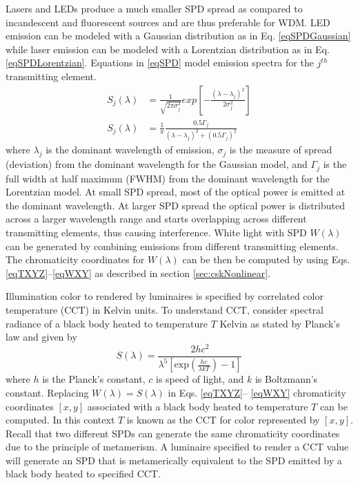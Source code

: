 Lasers and LEDs produce a much smaller SPD spread as compared to incandescent and fluorescent sources and are thus preferable for WDM. LED emission can be modeled with a Gaussian distribution as in Eq. \eqref{eqSPDGaussian} while laser emission can be modeled with a Lorentzian distribution as in Eq. \eqref{eqSPDLorentzian}. Equations in \eqref{eqSPD} model emission spectra for the $j^{th}$ transmitting element.
\begin{subequations}
\begin{align}
S_j(\lambda) &= \frac{1}{\sqrt{2\pi\sigma_j^2}}exp\left[-\frac{(\lambda-\lambda_j)^2}{2\sigma_j^2}\right]\label{eqSPDGaussian}\\
S_j(\lambda) &= \frac{1}{\pi}\frac{0.5\Gamma_j}{(\lambda-\lambda_j)^2 + (0.5\Gamma_j)^2}\label{eqSPDLorentzian}
\end{align}
\label{eqSPD}
\end{subequations}
where $\lambda_j$ is the dominant wavelength of emission, $\sigma_j$ is the measure of spread (deviation) from the dominant wavelength for the Gaussian model, and $\Gamma_j$ is the full width at half maximum (FWHM) from the dominant wavelength for the Lorentzian model. At small SPD spread, most of the optical power is emitted at the dominant wavelength. At larger SPD spread the optical power is distributed across a larger wavelength range and starts overlapping across different transmitting elements, thus causing interference. White light with SPD $W(\lambda)$ can be generated by combining emissions from different transmitting elements. The chromaticity coordinates for $W(\lambda)$ can be then be computed by using Eqs. \eqref{eqTXYZ}--\eqref{eqWXY} as described in section \ref{sec:cskNonlinear}.

Illumination color to rendered by luminaires is specified by correlated color temperature (CCT) in Kelvin units. To understand CCT, consider spectral radiance of a black body heated to temperature $T$ Kelvin as stated by Planck's law and given by
\begin{equation}
\label{eqPlanck}
	 S(\lambda) = \frac{2hc^2}{\lambda^5\left[\text{exp}\left(\frac{hc}{\lambda kT}\right)-1\right]}
\end{equation}
where $h$ is the Planck's constant, $c$ is speed of light, and $k$ is Boltzmann's constant. Replacing $W(\lambda)=S(\lambda)$ in Eqs. \eqref{eqTXYZ}-- \eqref{eqWXY} chromaticity coordinates $[x,y]$ associated with a black body heated to temperature $T$ can be computed. In this context $T$ is known as the CCT for color represented by $[x,y]$. Recall that two different SPDs can generate the same chromaticity coordinates due to the principle of metamerism. A luminaire specified to render a CCT value will generate an SPD that is metamerically equivalent to the SPD emitted by a black body heated to specified CCT.

